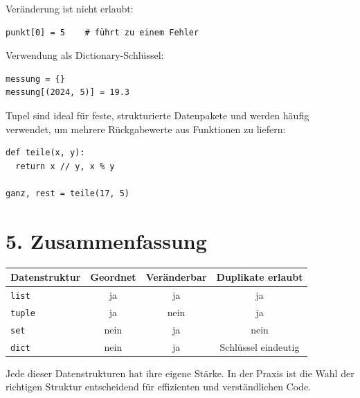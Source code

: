 \documentclass[12pt]{article}
\begin{document}
	Veränderung ist nicht erlaubt:
	
\begin{verbatim}
punkt[0] = 5    # führt zu einem Fehler
\end{verbatim}

	Verwendung als Dictionary-Schlüssel:
	
\begin{verbatim}
messung = {}
messung[(2024, 5)] = 19.3
\end{verbatim}
	
	Tupel sind ideal für feste, strukturierte Datenpakete und werden häufig verwendet, um mehrere Rückgabewerte aus Funktionen zu liefern:
	
\begin{verbatim}
def teile(x, y):
  return x // y, x % y

ganz, rest = teile(17, 5)
\end{verbatim}

	\section*{5. Zusammenfassung}
	
	\begin{tabular}{l|c|c|c}
		Datenstruktur & Geordnet & Veränderbar & Duplikate erlaubt \\
		\hline
		\texttt{list} & ja       & ja          & ja \\
		\texttt{tuple} & ja      & nein        & ja \\
		\texttt{set} & nein      & ja          & nein \\
		\texttt{dict} & nein     & ja          & Schlüssel eindeutig \\
	\end{tabular}
	
	Jede dieser Datenstrukturen hat ihre eigene Stärke. In der Praxis ist die Wahl der richtigen Struktur entscheidend für effizienten und verständlichen Code.
	
	
	
\end{document}

